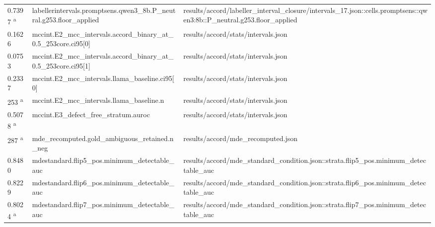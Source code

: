 \begin{longtable}{@{}p{0.7in}p{1.9in}p{2.6in}@{}}
0.7397 \textsuperscript{a} & labellerintervals.\allowbreak{}promptsens.\allowbreak{}qwen3\_8b.\allowbreak{}P\_neutral.\allowbreak{}g253.\allowbreak{}floor\_applied & results/\allowbreak{}accord/\allowbreak{}labeller\_interval\_closure/\allowbreak{}intervals\_17.\allowbreak{}json::cells.\allowbreak{}promptsens::qwen3:8b::P\_neutral.\allowbreak{}g253.\allowbreak{}floor\_applied\\
0.1626 & mccint.\allowbreak{}E2\_mcc\_intervals.\allowbreak{}accord\_binary\_at\_0.\allowbreak{}5\_253core.\allowbreak{}ci95[0] & results/\allowbreak{}accord/\allowbreak{}stats/\allowbreak{}intervals.\allowbreak{}json\\
0.0753 & mccint.\allowbreak{}E2\_mcc\_intervals.\allowbreak{}accord\_binary\_at\_0.\allowbreak{}5\_253core.\allowbreak{}ci95[1] & results/\allowbreak{}accord/\allowbreak{}stats/\allowbreak{}intervals.\allowbreak{}json\\
0.2337 & mccint.\allowbreak{}E2\_mcc\_intervals.\allowbreak{}llama\_baseline.\allowbreak{}ci95[0] & results/\allowbreak{}accord/\allowbreak{}stats/\allowbreak{}intervals.\allowbreak{}json\\
253 \textsuperscript{a} & mccint.\allowbreak{}E2\_mcc\_intervals.\allowbreak{}llama\_baseline.\allowbreak{}n & results/\allowbreak{}accord/\allowbreak{}stats/\allowbreak{}intervals.\allowbreak{}json\\
0.5078 \textsuperscript{a} & mccint.\allowbreak{}E3\_defect\_free\_stratum.\allowbreak{}auroc & results/\allowbreak{}accord/\allowbreak{}stats/\allowbreak{}intervals.\allowbreak{}json\\
287 \textsuperscript{a} & mde\_recomputed.\allowbreak{}gold\_ambiguous\_retained.\allowbreak{}n\_neg & results/\allowbreak{}accord/\allowbreak{}mde\_recomputed.\allowbreak{}json\\
0.8480 & mdestandard.\allowbreak{}flip5\_pos.\allowbreak{}minimum\_detectable\_auc & results/\allowbreak{}accord/\allowbreak{}mde\_standard\_condition.\allowbreak{}json::strata.\allowbreak{}flip5\_pos.\allowbreak{}minimum\_detectable\_auc\\
0.8229 & mdestandard.\allowbreak{}flip6\_pos.\allowbreak{}minimum\_detectable\_auc & results/\allowbreak{}accord/\allowbreak{}mde\_standard\_condition.\allowbreak{}json::strata.\allowbreak{}flip6\_pos.\allowbreak{}minimum\_detectable\_auc\\
0.8024 \textsuperscript{a} & mdestandard.\allowbreak{}flip7\_pos.\allowbreak{}minimum\_detectable\_auc & results/\allowbreak{}accord/\allowbreak{}mde\_standard\_condition.\allowbreak{}json::strata.\allowbreak{}flip7\_pos.\allowbreak{}minimum\_detectable\_auc\\

\end{longtable}

